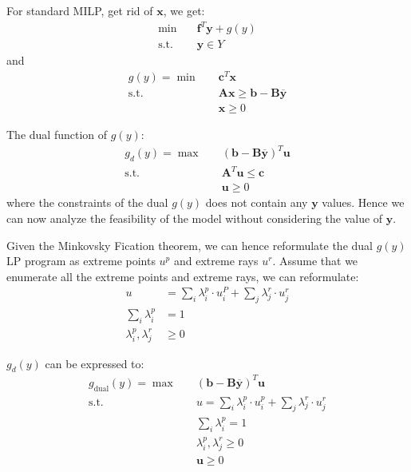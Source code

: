 \documentclass[fleqn,10pt]{wlscirep}
\begin{document}
For standard MILP, get rid of $\mathbf{x}$, we get:
\begin{align}
    \min \quad& \mathbf{f} ^ { T } \mathbf{y} + g ( y ) \\
    \text{s.t.} \quad& \mathbf{y} \in Y
\end{align}
and 
\begin{align}
    g(y) = \min \quad& \mathbf{c}^{T} \mathbf{x} \\
    \text{s.t.} \quad& \mathbf{A} \mathbf{x} \geq \mathbf{b} - \mathbf{B} \overline{\mathbf{y}} \\ 
    & \mathbf{x} \geq 0
\end{align}

The dual function of $g(y)$:
\begin{align}
    g_d(y) = \max \quad& (\mathbf{b} - \mathbf{B}\overline{\mathbf{y}})^{T} \mathbf{u} \\
    \text{s.t.} \quad& \mathbf{A}^{T} \mathbf{u} \leq \mathbf{c} \\ 
    & \mathbf{u} \geq 0
\end{align}
where the constraints of the dual $g(y)$ does not contain any $\mathbf{y}$ values. Hence we can now analyze the feasibility of the model without considering the value of $\mathbf{y}$.

Given the Minkovsky Fication theorem, we can hence reformulate the dual $g(y)$ LP program as extreme points $u^p$ and extreme rays $u^r$. Assume that we enumerate all the extreme points and extreme rays, we can reformulate:
\begin{align} 
    u & = \sum _ { i } \lambda _ { i } ^ { p } \cdot u _ { i } ^ { P } + \sum _ { j } \lambda _ { j } ^ { r } \cdot u _ { j } ^ { r } \\ 
    \sum _ { i } \lambda _ { i } ^ { p } &= 1 \\
    \lambda _ { i } ^ { p } , \lambda _ { j } ^ { r } & \geq 0 
\end{align}

$g_d(y)$ can be expressed to:
\begin{align}
    g_{\text{dual}}(y) = \max \quad& (\mathbf{b} - \mathbf{B}\overline{\mathbf{y}})^{T} \mathbf{u} \\
    \text{s.t.} \quad& u = \sum _ { i } \lambda _ { i } ^ { p } \cdot u _ { i } ^ { p } + \sum _ { j } \lambda _ { j } ^ { r } \cdot u _ { j } ^ { r } \\ 
    & \sum _ { i } \lambda _ { i } ^ { p } = 1 \\ 
    & \lambda _ { i } ^ { p } , \lambda _ { j } ^ { r } \geq 0 \\
    & \mathbf{u} \geq 0
\end{align}
\end{document}
